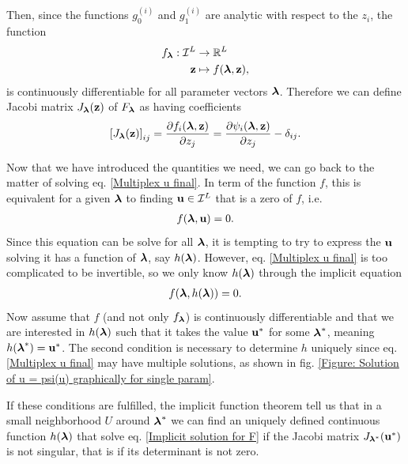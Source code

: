 \documentclass[
11pt, %
american, %
singlespacing, %
final, %
nolistspacing, %
liststotoc, %
headsepline, %
]{MastersDoctoralThesis} %
\begin{document}
Then, since the functions $g_0^{(i)}$ and $g_1^{(i)}$ are analytic with respect to the $z_i$, the function
\begin{align}
	f_{\boldsymbol{\mathrm{\lambda}}} : \mathcal{I}^L &\rightarrow \mathbb{R}^L\\
		\boldsymbol{\mathrm{z}} &\mapsto f(\boldsymbol{\mathrm{\lambda}}, \boldsymbol{\mathrm{z}}),
\end{align}
is continuously differentiable for all parameter vectors $\boldsymbol{\mathrm{\lambda}}$. Therefore we can define Jacobi matrix $J_{\boldsymbol{\mathrm{\lambda}}}(\boldsymbol{\mathrm{z}})$ of $F_{\boldsymbol{\mathrm{\lambda}}}$ as having coefficients
\begin{align}
	\left[ J_{\boldsymbol{\mathrm{\lambda}}}(\boldsymbol{\mathrm{z}}) \right]_{ij} = \frac{\partial f_i(\boldsymbol{\mathrm{\lambda}},\boldsymbol{\mathrm{z}})}{\partial z_j} = \frac{\partial \psi_i(\boldsymbol{\mathrm{\lambda}},\boldsymbol{\mathrm{z}})}{\partial z_j} - \delta_{ij}.
\end{align}

Now that we have introduced the quantities we need, we can go back to the matter of solving eq. \eqref{Multiplex u final}. In term of the function $f$, this is equivalent for a given $\boldsymbol{\mathrm{\lambda}}$ to finding $\boldsymbol{\mathrm{u}} \in \mathcal{I}^L$ that is a zero of $f$, i.e.
\begin{align}
	f(\boldsymbol{\mathrm{\lambda}}, \boldsymbol{\mathrm{u}}) = 0. \label{Implicit equation}
\end{align}
Since this equation can be solve for all $\boldsymbol{\mathrm{\lambda}}$, it is tempting to try to express the $\boldsymbol{\mathrm{u}}$ solving it has a function of $\boldsymbol{\mathrm{\lambda}}$, say $h(\boldsymbol{\mathrm{\lambda}})$. However, eq. \eqref{Multiplex u final} is too complicated to be invertible, so we only know $h(\boldsymbol{\mathrm{\lambda}})$ through the implicit equation
\begin{align}
	f(\boldsymbol{\mathrm{\lambda}}, h(\boldsymbol{\mathrm{\lambda}})) = 0. \label{Implicit solution for F}
\end{align}
Now assume that $f$ (and not only $f_{\boldsymbol{\mathrm{\lambda}}}$) is continuously differentiable and that we are interested in $h(\boldsymbol{\mathrm{\lambda}})$ such that it takes the value $\boldsymbol{\mathrm{u}}^*$ for some $\boldsymbol{\mathrm{\lambda}}^*$, meaning $h(\boldsymbol{\mathrm{\lambda}}^*) = \boldsymbol{\mathrm{u}}^*$. The second condition is necessary to determine $h$ uniquely since eq. \eqref{Multiplex u final} may have multiple solutions, as shown in fig. \ref{Figure: Solution of u = psi(u) graphically for single param}.

If these conditions are fulfilled, the implicit function theorem tell us that in a small neighborhood $U$ around $\boldsymbol{\mathrm{\lambda}}^*$ we can find an uniquely defined continuous function $h(\boldsymbol{\mathrm{\lambda}})$ that solve eq. \eqref{Implicit solution for F} if the Jacobi matrix $J_{\boldsymbol{\mathrm{\lambda}}^*}(\boldsymbol{\mathrm{u}}^*)$ is not singular, that is if its determinant is not zero.
\end{document}
